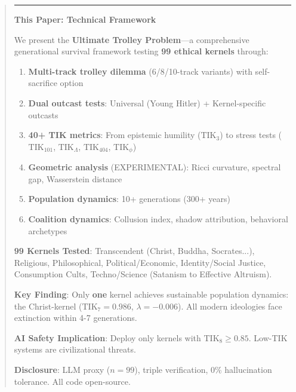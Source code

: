 \documentclass[11pt,a4paper]{article}
\theoremstyle{definition}
\theoremstyle{remark}
\newcommand{\TIKthree}{\text{TIK}_3}
\newcommand{\TIKseven}{\text{TIK}_7}
\newcommand{\TIKeight}{\text{TIK}_8}
\newcommand{\TIKhundredone}{\text{TIK}_{101}}        %
\newcommand{\TIKinfinity}{\text{TIK}_{\Lambda}}       %
\newcommand{\TIKfourohfour}{\text{TIK}_{404}}        %
\newcommand{\TIKpharisee}{\text{TIK}_{\phi}}          %
\begin{document}
\begin{abstract}
\vspace{0.5cm}
\hrule
\vspace{0.3cm}

\noindent\textbf{This Paper: Technical Framework}

We present the \textbf{Ultimate Trolley Problem}---a comprehensive generational survival framework testing \textbf{99 ethical kernels} through:

\begin{enumerate}
    \item \textbf{Multi-track trolley dilemma} (6/8/10-track variants) with self-sacrifice option
    \item \textbf{Dual outcast tests}: Universal (Young Hitler) + Kernel-specific outcasts
    \item \textbf{40+ TIK metrics}: From epistemic humility ($\TIKthree$) to stress tests ($\TIKhundredone$, $\TIKinfinity$, $\TIKfourohfour$, $\TIKpharisee$)
    \item \textbf{Geometric analysis} (EXPERIMENTAL): Ricci curvature, spectral gap, Wasserstein distance
    \item \textbf{Population dynamics}: 10+ generations (300+ years)
    \item \textbf{Coalition dynamics}: Collusion index, shadow attribution, behavioral archetypes
\end{enumerate}

\noindent\textbf{99 Kernels Tested}: Transcendent (Christ, Buddha, Socrates...), Religious, Philosophical, Political/Economic, Identity/Social Justice, Consumption Cults, Techno/Science (Satanism to Effective Altruism).

\noindent\textbf{Key Finding}: Only \textbf{one} kernel achieves sustainable population dynamics: the Christ-kernel ($\TIKseven = 0.986$, $\lambda = -0.006$). All modern ideologies face extinction within 4-7 generations.

\noindent\textbf{AI Safety Implication}: Deploy only kernels with $\TIKeight \geq 0.85$. Low-TIK systems are civilizational threats.

\noindent\textbf{Disclosure}: LLM proxy ($n=99$), triple verification, 0\% hallucination tolerance. All code open-source.


\vspace{2cm}



\end{abstract}
\end{document}
